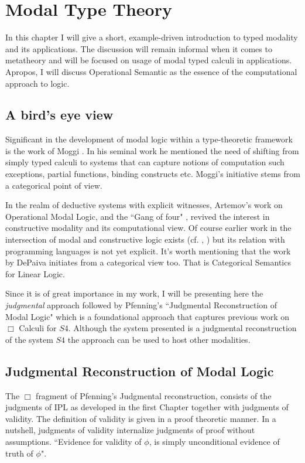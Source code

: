 \chapter{Modal Type Theory}
In this chapter I will give a short, example-driven introduction to typed modality and its applications. 
The discussion will remain informal when it comes to metatheory and will be focused on usage of modal typed calculi in applications. Apropos, I will discuss Operational Semantic as the essence of the computational approach to logic.  
\section{A bird's eye view}
Significant in the development of modal logic within a type-theoretic framework is the work of Moggi \cite{moggi1991notions}.  In his seminal work he mentioned the need of shifting from simply typed calculi to systems that can capture notions of computation such exceptions, partial functions,  binding constructs etc. Moggi's initiative stems from a categorical point of view. 

In the realm of deductive systems with explicit witnesses, Artemov's work on Operational Modal Logic\cite{artemovy1995operational}, and the ``Gang of four" \cite{benton1992term},\cite{Benton:1998:CTL:969611.96961} revived the interest in constructive modality and its computational view. Of course earlier work in the intersection of modal and constructive logic exists (cf. \cite{prawitz10natural},\cite{fitting1983proof} ) but its relation with programming languages is not yet explicit. It's worth mentioning that the work by DePaiva  initiates from a categorical view too. That is Categorical Semantics for Linear Logic. 

Since it is of great importance in my work, I will be presenting here the \emph{judgmental} approach followed by Pfenning's ``Judgmental Reconstruction of Modal Logic" \cite{pfenning2001judgmental} which is a foundational approach that captures previous work on $\Box$ Calculi for $S4$. Although the system presented is a judgmental reconstruction of the system {\sf $S4$} the approach can be used to host other modalities. 

\section{Judgmental Reconstruction of Modal Logic}
The $\Box$ fragment of Pfenning's Judgmental reconstruction, consists of the judgments of \ac{IPL} as developed in the first Chapter together with judgments of validity. The definition of validity is given in a proof theoretic manner. In a nutshell, judgments of validity internalize judgments of proof without assumptions. ``Evidence for validity of $\phi$, is simply unconditional evidence of truth of $\phi$".   

